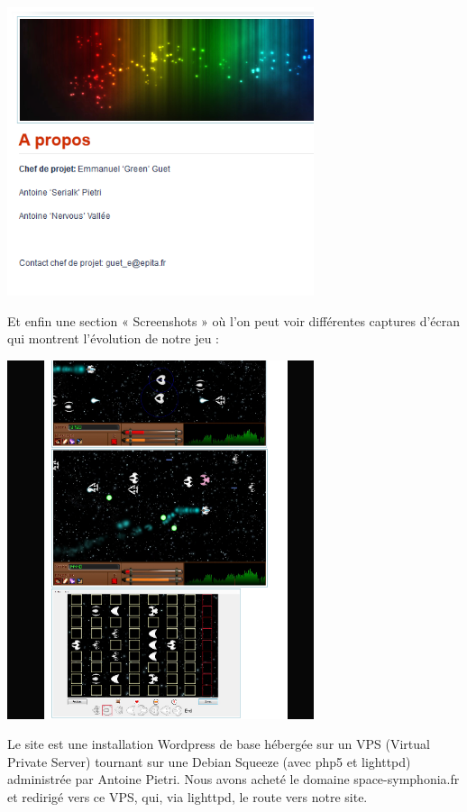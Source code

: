 \begin{center}
	\includegraphics[width=9cm]{images/site3.png}
\end{center}

Et enfin une section « Screenshots » où l'on peut voir différentes captures d'écran qui montrent l'évolution de notre jeu :

\begin{center}
	\includegraphics[width=9cm]{images/site4.png}
\end{center}

Le site est une installation Wordpress de base hébergée sur un VPS (Virtual Private Server) tournant sur une Debian Squeeze (avec php5 et lighttpd) administrée par Antoine Pietri. Nous avons acheté le domaine space-symphonia.fr et redirigé vers ce VPS, qui, via lighttpd, le route vers notre site.